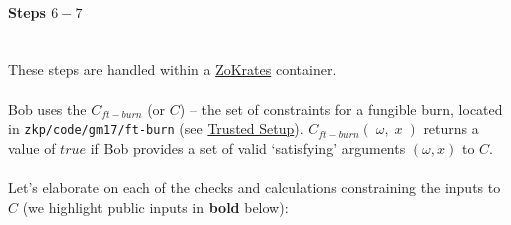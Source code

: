 \documentclass{article}
\begin{document}
\paragraph{Steps $6 - 7$}
\ \\
These steps are handled within a \hyperref[sec:zokrates]{ZoKrates} container.\\
\\
Bob uses the $C_{ft-burn}$ (or $C$) -- the set of constraints for a fungible burn, located in \texttt{zkp/code/gm17/ft-burn} (see \hyperref[sec:trustedSetup]{Trusted Setup}). $C_{ft-burn}(\;\omega,\;x\;)$ returns a value of $true$ if Bob provides a set of valid `satisfying' arguments $(\omega, x)$ to $C$.\\
\\
Let's elaborate on each of the checks and calculations constraining the inputs to $C$ (we highlight public inputs in \textbf{bold} below):
\end{document}
